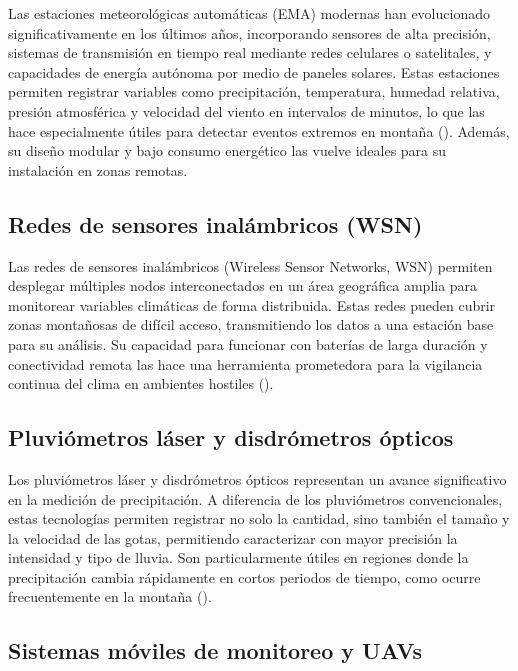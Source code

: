 Las estaciones meteorológicas automáticas (EMA) modernas han evolucionado significativamente en los últimos años, incorporando sensores de alta precisión, sistemas de transmisión en tiempo real mediante redes celulares o satelitales, y capacidades de energía autónoma por medio de paneles solares. Estas estaciones permiten registrar variables como precipitación, temperatura, humedad relativa, presión atmosférica y velocidad del viento en intervalos de minutos, lo que las hace especialmente útiles para detectar eventos extremos en montaña  (\cite{sabziparvar2019estimation}). Además, su diseño modular y bajo consumo energético las vuelve ideales para su instalación en zonas remotas.

\subsection{Redes de sensores inalámbricos (WSN)}

Las redes de sensores inalámbricos (Wireless Sensor Networks, WSN) permiten desplegar múltiples nodos interconectados en un área geográfica amplia para monitorear variables climáticas de forma distribuida. Estas redes pueden cubrir zonas montañosas de difícil acceso, transmitiendo los datos a una estación base para su análisis. Su capacidad para funcionar con baterías de larga duración y conectividad remota las hace una herramienta prometedora para la vigilancia continua del clima en ambientes hostiles  (\cite{matese2009wireless}).

\subsection{Pluviómetros láser y disdrómetros ópticos}

Los pluviómetros láser y disdrómetros ópticos representan un avance significativo en la medición de precipitación. A diferencia de los pluviómetros convencionales, estas tecnologías permiten registrar no solo la cantidad, sino también el tamaño y la velocidad de las gotas, permitiendo caracterizar con mayor precisión la intensidad y tipo de lluvia. Son particularmente útiles en regiones donde la precipitación cambia rápidamente en cortos periodos de tiempo, como ocurre frecuentemente en la montaña  (\cite{lenz2017optical}).

\subsection{Sistemas móviles de monitoreo y UAVs}

